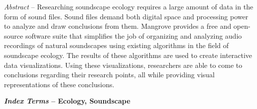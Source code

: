 \begin{flushleft}
  \setlength{\parindent}{0.125in}
  {
    {\indent\fontsize{9}{11}\bfseries
      \par\textit{Abstract}  -- Researching soundscape ecology requires a large amount of data in the form of sound files. Sound files demand both digital space and processing power to analyze and draw conclusions from them. Mangrove provides a free and open-source software suite that simplifies the job of organizing and analyzing audio recordings of natural soundscapes using existing algorithms in the field of soundscape ecology. The results of these algorithms are used to create interactive data visualizations. Using these visualizations, researchers are able to come to conclusions regarding their research points, all while providing visual representations of these conclusions.
    }
    \par{\fontsize{9}{11}\bfseries
      \textit{Index Terms}  -- Ecology, Soundscape
    }
  }
  \vspace{10mm} %
\end{flushleft}
